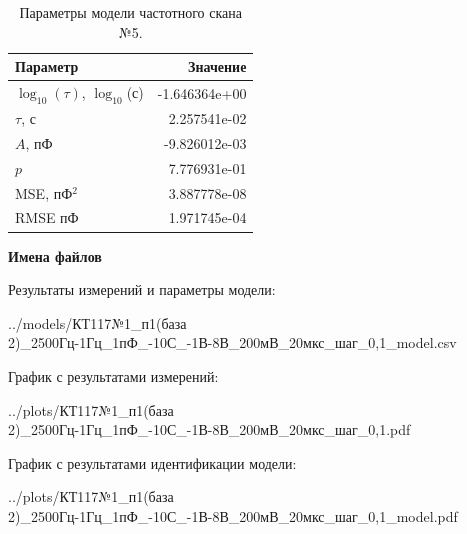 \begin{table}[!ht]
    \centering
    \caption{Параметры модели частотного скана №5.}
    \begin{tabular}{|l|r|}
        \hline
        Параметр                                       & Значение                  \\ \hline
        $\log_{10}(\tau)$, $\log_{10}$(с)              & -1.646364e+00             \\ \hline
        $\tau$, с                                      & 2.257541e-02              \\ \hline
        $A$, пФ                                        & -9.826012e-03             \\ \hline
        $p$                                            & 7.776931e-01              \\ \hline
        MSE, пФ$^2$                                    & 3.887778e-08              \\ \hline
        RMSE пФ                                        & 1.971745e-04              \\ \hline
    \end{tabular}
    \label{table:frequency_scan_model_5}
\end{table}

\textbf{Имена файлов}

Результаты измерений и параметры модели:

\scriptsize../models/КТ117№1\_п1(база 2)\_2500Гц-1Гц\_1пФ\_-10С\_-1В-8В\_200мВ\_20мкс\_шаг\_0,1\_model.csv
\normalsize

График с результатами измерений:

\scriptsize../plots/КТ117№1\_п1(база 2)\_2500Гц-1Гц\_1пФ\_-10С\_-1В-8В\_200мВ\_20мкс\_шаг\_0,1.pdf
\normalsize

График с результатами идентификации модели:

\scriptsize../plots/КТ117№1\_п1(база 2)\_2500Гц-1Гц\_1пФ\_-10С\_-1В-8В\_200мВ\_20мкс\_шаг\_0,1\_model.pdf
\normalsize

